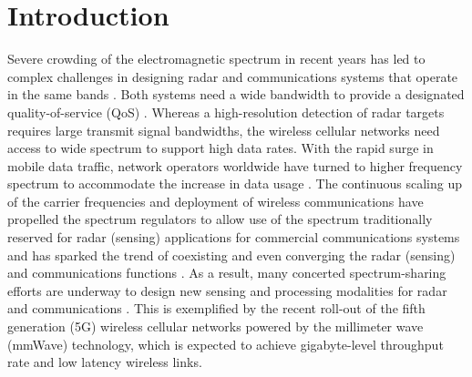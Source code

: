 \documentclass[10pt,journal]{IEEEtran}
\theoremstyle{definition}
\begin{document}
\section{Introduction}
\color{blue}Severe crowding of the electromagnetic spectrum in recent years has led to complex challenges in designing radar and communications systems that operate in the same bands \textcolor{red}{\cite{Petropulu2020dfrc,mishra2019toward,zheng2019overiview,liu2018toward}}. Both systems need a wide bandwidth to provide a designated quality-of-service (QoS) \cite{dokhanchi2019mmwave,biswas2018fdqos}. Whereas a high-resolution detection of radar targets requires large transmit signal bandwidths\cite{Eldar2020jointradarcomm}, 
the wireless cellular networks need access to wide spectrum to support high data rates\cite{biswas2018fdqos,Lops2020uplink}. With the rapid surge in mobile data traffic, network operators worldwide have turned to higher frequency spectrum to accommodate the increase in data usage \cite{Petropulu2020dfrc,mishra2019toward,zheng2019overiview,liu2018toward}. The continuous scaling up of the carrier frequencies and deployment of wireless communications have propelled the spectrum regulators to allow use of the spectrum traditionally reserved for radar (sensing) applications for commercial communications systems and has sparked the trend of coexisting and even converging the radar (sensing) and communications functions \cite{zheng2019overiview}.
As a result, many concerted spectrum-sharing efforts are underway to design new sensing and processing modalities for radar and communications \textcolor{red}{\cite{Petropulu2020dfrc,mishra2019toward,liu2018toward,Elsdar2020JRCjointbeamforming,JRCKoivunen2020hybridradarbf,Heath18802commradar,Lops2019interference}}. %
\iffalse
This is exemplified by the recent roll-out of the fifth generation (5G) wireless cellular networks powered by the millimeter wave (mmWave) technology, which is expected to achieve gigabyte-level throughput rate and low latency wireless links.  %
\end{document}
